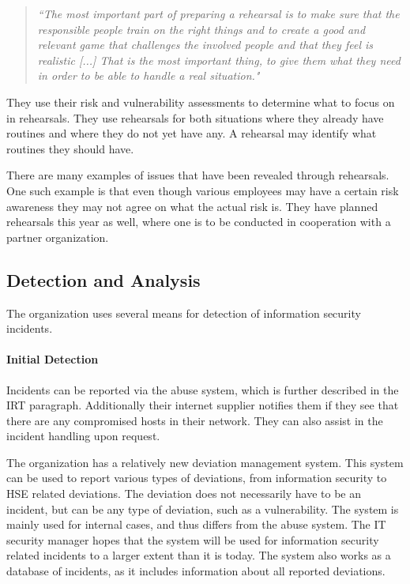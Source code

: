 \begin{quote}
\textit{``The most important part of preparing a rehearsal is to make sure that the responsible people train on the right things and to create a good and relevant game that challenges the involved people and that they feel is realistic [...] That is the most important thing, to give them what they need in order to be able to handle a real situation."}
\end{quote}

They use their risk and vulnerability assessments to determine what to focus on in rehearsals. They use rehearsals for both situations where they already have routines and where they do not yet have any. A rehearsal may identify what routines they should have.

There are many examples of issues that have been revealed through rehearsals. One such example is that even though various employees may have a certain risk awareness they may not agree on what the actual risk is. They have planned rehearsals this year as well, where one is to be conducted in cooperation with a partner organization. %

\subsection{Detection and Analysis}
The organization uses several means for detection of information security incidents.

\paragraph{Initial Detection}
Incidents can be reported via the abuse system, which is further described in the \ac{IRT} paragraph. Additionally their internet supplier notifies them if they see that there are any compromised hosts in their network. They can also assist in the incident handling upon request.

The organization has a relatively new deviation management system. This system can be used to report various types of deviations, from information security to \ac{HSE} related deviations. The deviation does not necessarily have to be an incident, but can be any type of deviation, such as a vulnerability. The system is mainly used for internal cases, and thus differs from the abuse system. The IT security manager hopes that the system will be used for information security related incidents to a larger extent than it is today. The system also works as a database of incidents, as it includes information about all reported deviations.  

